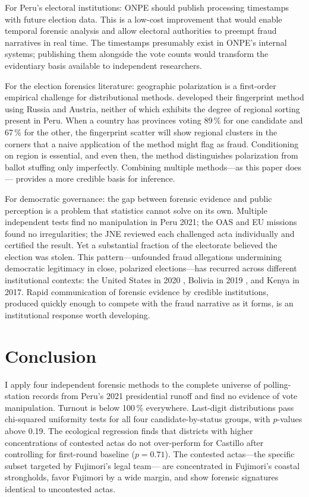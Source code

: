 \documentclass[12pt]{article}
\begin{document}
For Peru's electoral institutions: ONPE should publish processing timestamps
with future election data. This is a low-cost improvement that would enable
temporal forensic analysis and allow electoral authorities to preempt fraud
narratives in real time. The timestamps presumably exist in ONPE's internal
systems; publishing them alongside the vote counts would transform the
evidentiary basis available to independent researchers.

For the election forensics literature: geographic polarization is a
first-order empirical challenge for distributional methods. \citet{klimek2012}
developed their fingerprint method using Russia and Austria, neither of which
exhibits the degree of regional sorting present in Peru. When a country has
provinces voting 89\,\% for one candidate and 67\,\% for the other, the
fingerprint scatter will show regional clusters in the corners that a naive
application of the method might flag as fraud. Conditioning on region is
essential, and even then, the method distinguishes polarization from ballot
stuffing only imperfectly. Combining multiple methods---as this paper does---
provides a more credible basis for inference.

For democratic governance: the gap between forensic evidence and public
perception is a problem that statistics cannot solve on its own.
Multiple independent tests find no manipulation in Peru 2021;
the OAS and EU missions found no irregularities; the JNE reviewed each
challenged acta individually and certified the result. Yet a substantial
fraction of the electorate believed the election was stolen.
This pattern---unfounded fraud allegations undermining democratic legitimacy
in close, polarized elections---has recurred across different institutional
contexts: the United States in 2020 \citep{eggers2021}, Bolivia in 2019
\citep{idrobo2022, escobari2024}, and Kenya in 2017. Rapid communication of forensic evidence
by credible institutions, produced quickly enough to compete with the fraud
narrative as it forms, is an institutional response worth developing.

\section{Conclusion}
\label{sec:conclusion}

I apply four independent forensic methods to the complete universe of
polling-station records from Peru's 2021 presidential runoff and find no
evidence of vote manipulation. Turnout is below 100\,\% everywhere. Last-digit
distributions pass chi-squared uniformity tests for all four candidate-by-status
groups, with $p$-values above 0.19. The ecological regression finds that
districts with higher concentrations of contested actas do not over-perform
for Castillo after controlling for first-round baseline ($p = 0.71$). The
contested actas---the specific subset targeted by Fujimori's legal team---
are concentrated in Fujimori's coastal strongholds, favor Fujimori by a
wide margin, and show forensic signatures identical to uncontested actas.
\end{document}

